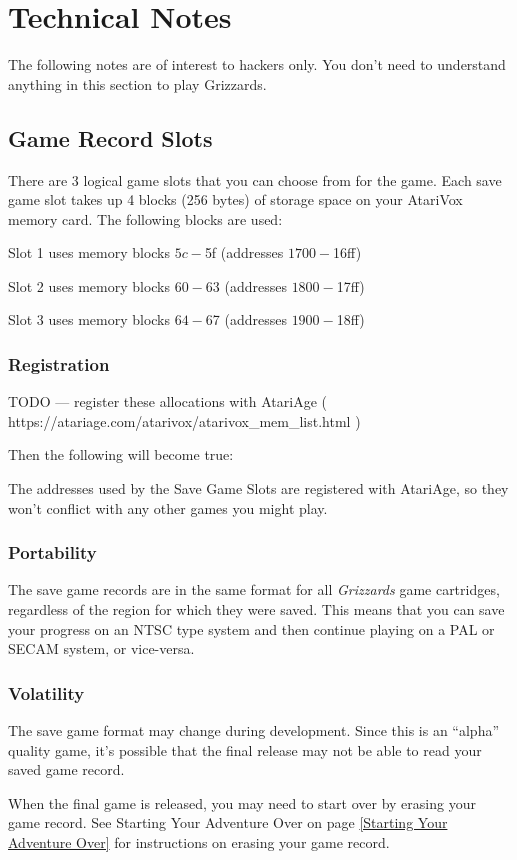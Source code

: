 \documentclass[10pt,twoside,openright]{memoir}
\begin{document}
\chapter{Technical Notes}

The following notes are of interest to hackers only. You don't need to
understand anything in this section to play Grizzards.

\section{Game Record Slots}

There are 3 logical game slots that you can choose from for the
game. Each save game slot takes up 4 blocks (256 bytes) of storage
space on your AtariVox memory card. The following blocks are used:

\begin{enumeration}
\item Slot 1 uses memory blocks $5c-$5f (addresses $1700-$16ff)
\item Slot 2 uses memory blocks $60-$63 (addresses $1800-$17ff)
\item Slot 3 uses memory blocks $64-$67 (addresses $1900-$18ff)
\end{enumeration}

\subsection{Registration}

TODO --- register these allocations with AtariAge (
https://atariage.com/atarivox/atarivox\_mem\_list.html )

Then the following will become true:

The addresses used by the Save Game Slots are registered with
AtariAge, so they won't conflict with any other games you might play.

\subsection{Portability}

The save game records are in the same format for all \emph{Grizzards} game
cartridges, regardless of the region for which they were saved.  This means
that you can save your progress on an NTSC type system and then continue
playing on a PAL or SECAM system, or vice-versa.

\subsection{Volatility}

The save game format may change during development. Since this is an
``alpha'' quality game, it's possible that the final release may not
be able to read your saved game record.

When the final game is released, you may need to start over by erasing
your game record. See Starting Your Adventure Over on page
\ref{Starting Your Adventure Over} for instructions on erasing your
game record.
\end{document}
